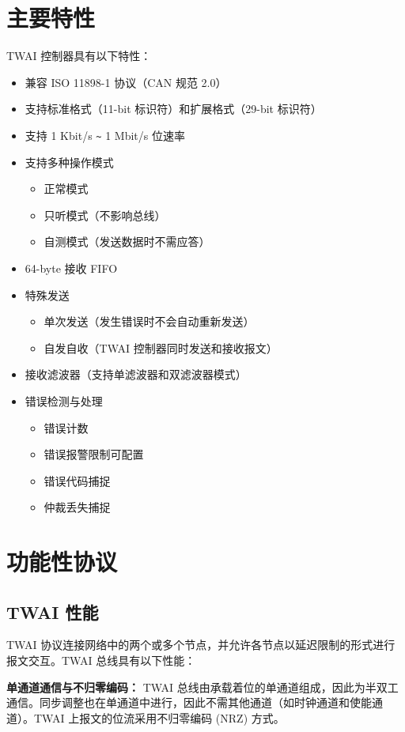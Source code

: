 \documentclass[main\_\_CN.tex]{subfiles}
\begin{document}
\section{主要特性}
\chipname{} TWAI 控制器具有以下特性：
\begin{itemize}
    \item 兼容 ISO 11898-1 协议（CAN 规范 2.0）
    \item 支持标准格式（11-bit 标识符）和扩展格式（29-bit 标识符）
    \item 支持 1 Kbit/s \verb+~+ 1 Mbit/s 位速率
    \item 支持多种操作模式
    \begin{itemize}
        \item 正常模式
        \item 只听模式（不影响总线）
        \item 自测模式（发送数据时不需应答）
    \end{itemize}
    \item 64-byte 接收 FIFO
    \item 特殊发送
    \begin{itemize}
        \item 单次发送（发生错误时不会自动重新发送）
        \item 自发自收（TWAI 控制器同时发送和接收报文）
    \end{itemize}
    \item 接收滤波器（支持单滤波器和双滤波器模式）
    \item 错误检测与处理
    \begin{itemize}
        \item 错误计数
        \item 错误报警限制可配置
        \item 错误代码捕捉
        \item 仲裁丢失捕捉
    \end{itemize}
\end{itemize}

\section{功能性协议}
\label{sec:twai-functional-protocol}
\subsection{TWAI 性能}
TWAI 协议连接网络中的两个或多个节点，并允许各节点以延迟限制的形式进行报文交互。TWAI 总线具有以下性能：

{\bfseries 单通道通信与不归零编码：} TWAI 总线由承载着位的单通道组成，因此为半双工通信。同步调整也在单通道中进行，因此不需其他通道（如时钟通道和使能通道）。TWAI 上报文的位流采用不归零编码 (NRZ) 方式。
\end{document}

